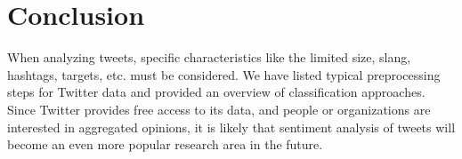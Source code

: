 \documentclass{acm_proc_article-sp}
\begin{document}
\section{Conclusion} \label{conclusion}

When analyzing tweets, specific
characteristics like the limited size, slang, hashtags, targets, etc. must be
considered. We have listed typical preprocessing steps for Twitter data and
provided an overview of classification approaches.  Since Twitter provides free
access to its data, and people or organizations are interested in aggregated
opinions, it is likely that sentiment analysis of tweets will become an even
more popular research area in the future.



\end{document}
